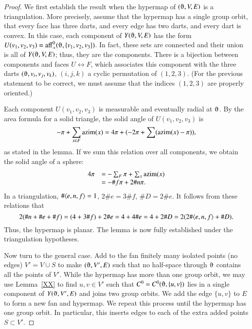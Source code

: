 \begin{proof}  We first establish the result when the hypermap
of $(\orgn,V,E)$ is a triangulation.  More precisely, assume that the hypermap has a single group orbit, that every face has three darts,
and every edge has two darts, and every dart is convex.  
In this case, each component 
of $Y(\orgn,V,E)$ has
the form $U(v_1,v_2,v_3)=\op{aff}_+^0(\orgn,\{v_1,v_2,v_3\})$.  In fact,
these sets are connected and their union is all of $Y(\orgn,V,E)$; thus,
they are the components.   There is a bijection
between components and faces $U \leftrightarrow F$, which associates this component
with the three darts $(\orgn,v_i,v_j,v_k)$, $(i,j,k)$ a cyclic permutation
of $(1,2,3)$.  (For the previous statement to be correct, we must assume
that the indices $(1,2,3)$ are properly oriented.)

Each component $U(v_1,v_2,v_3)$ is measurable and eventually radial
at $\orgn$.  By the area formula for a solid triangle, the solid angle of $U(v_1,v_2,v_3)$
is 
   $$-\pi + \sum_{x\in F} {\operatorname{azim}}(x) = 4\pi + (-2\pi + \sum ({\operatorname{azim}}(x) - \pi)),$$
as stated in the lemma.  If we sum this relation over all components, we obtain
the solid angle of a sphere:
   \begin{equation}\label{eqn:euler}
   \begin{array}{lll}
   4\pi &= -\sum_{F} \pi + \sum_{x} {\operatorname{azim}}(x)\\
        &= -\#f \pi + 2 \# n \pi.
   \end{array}
   \end{equation}
In a triangulation, $\#\langle e,n,f\rangle=1$, $2 \# e  = 3\#f$, $\# D = 2 \#e$.
It follows from these relations that
   $$
   2(\#n + \# e + \# f) = (4 + 3\#f) + 2\#e = 4 + 4\# e = 4 + 2 \# D = 2(2\#\langle e,n,f\rangle+\# D).
   $$
Thus, the hypermap is planar.  The lemma is now fully established under the
triangulation hypotheses.

Now turn to the general case.  Add to the fan finitely many isolated
points (no edges) $V' = V\cup S$ to make $(\orgn,V',E)$ such that no half-space
through $\orgn$ contains all the points of $V'$.    While the hypermap
has more than one group orbit, 
we may use Lemma~\ref{XX} to find $u,v\in V'$ such
that $C^0=C^0(\orgn,\{u,v\})$ lies in a single component of $Y(\orgn,V',E)$ and
joins two group orbits.  We add the edge $\{u,v\}$ to $E$ to form
a new fan and hypermap.
We repeat this process until the hypermap has one group orbit.  In particular, this
inserts edges to each of the extra added points $S\subset V'$.


\end{proof}
